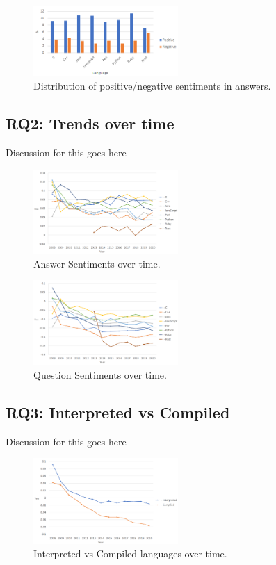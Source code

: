 \documentclass[conference]{IEEEtran}
\begin{document}
\begin{figure}[htbp]
\centerline{\includegraphics[width=0.49\textwidth]{figures/summA.png}}
\caption{Distribution of positive/negative sentiments in answers.}
\label{fig}
\end{figure}

\subsection{RQ2: Trends over time}
Discussion for this goes here

\begin{figure}[htbp]
\centerline{\includegraphics[width=0.49\textwidth]{figures/time_answers_em.png}}
\caption{Answer Sentiments over time.}
\label{fig}
\end{figure}

\begin{figure}[htbp]
\centerline{\includegraphics[width=0.49\textwidth]{figures/time_questions_em.png}}
\caption{Question Sentiments over time.}
\label{fig}
\end{figure}

\subsection{RQ3: Interpreted vs Compiled}
Discussion for this goes here

\begin{figure}[htbp]
\centerline{\includegraphics[width=0.49\textwidth]{figures/time_interpreted_compiled.png}}
\caption{Interpreted vs Compiled languages over time.}
\label{fig}
\end{figure}
\end{document}
